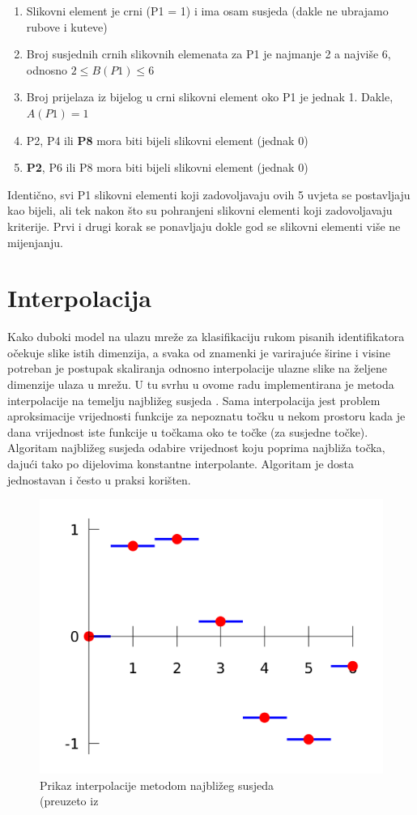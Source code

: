 \documentclass[times, utf8, diplomski]{fer}
\theoremstyle{definition}
\begin{document}
\begin{enumerate}
\item Slikovni element je crni (P1 = 1) i ima osam susjeda (dakle ne ubrajamo rubove i kuteve)
\item Broj susjednih crnih slikovnih elemenata za P1 je najmanje 2 a najviše 6, odnosno $2\leq B(P1)\leq6$
\item Broj prijelaza iz bijelog u crni slikovni element oko P1 je jednak 1. Dakle, $A(P1) = 1$
\item P2, P4 ili \textbf{P8} mora biti bijeli slikovni element (jednak 0)
\item \textbf{P2}, P6 ili P8 mora biti bijeli slikovni element (jednak 0)
\end{enumerate}

Identično, svi P1 slikovni elementi koji zadovoljavaju ovih 5 uvjeta se postavljaju kao bijeli, ali tek nakon što su pohranjeni slikovni elementi koji zadovoljavaju kriterije. Prvi i drugi korak se ponavljaju dokle god se slikovni elementi više ne mijenjanju.


\section{Interpolacija}
Kako duboki model na ulazu mreže za klasifikaciju rukom pisanih identifikatora očekuje slike istih dimenzija, a svaka od znamenki je varirajuće širine i visine potreban je postupak skaliranja odnosno interpolacije ulazne slike na željene dimenzije ulaza u mrežu. U tu svrhu u ovome radu implementirana je metoda interpolacije na temelju najbližeg susjeda . Sama interpolacija jest problem aproksimacije vrijednosti funkcije za nepoznatu točku u nekom prostoru kada je dana vrijednost iste funkcije u točkama oko te točke (za susjedne točke). Algoritam najbližeg susjeda odabire vrijednost koju poprima najbliža točka, dajući tako po dijelovima konstantne interpolante. Algoritam je dosta jednostavan i često u praksi korišten.

\begin{figure}[h]
\centering
\includegraphics[scale=0.12]{n_n_interpolation.png}
\caption{Prikaz interpolacije metodom najbližeg susjeda \\ (preuzeto iz \cite{interpolation:xxx}}
\end{figure}
\end{document}
